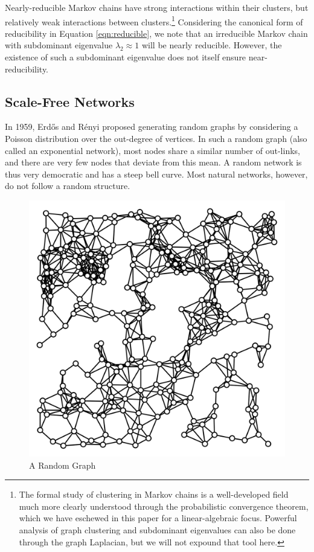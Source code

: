 \documentclass[12pt]{article}
\begin{document}
Nearly-reducible Markov chains have strong interactions within their clusters,
but relatively weak interactions between clusters.\footnote{The formal study of
  clustering in Markov chains is a well-developed field much more clearly
  understood through the probabilistic convergence theorem, which we have
  eschewed in this paper for a linear-algebraic focus. Powerful analysis of
  graph clustering and subdominant eigenvalues can also be done through the
  graph Laplacian, but we will not expound that tool here.} Considering the
canonical form of reducibility in Equation \eqref{eqn:reducible}, we note that
an irreducible Markov chain with subdominant eigenvalue $\lambda_2 \approx 1$
will be nearly reducible. However, the existence of such a subdominant
eigenvalue does not itself ensure near-reducibility.


\subsection{Scale-Free Networks}
In 1959, Erdős and Rényi proposed generating random graphs by considering a
Poisson distribution over the out-degree of vertices. In such a random graph
(also called an exponential network), most nodes share a similar number of
out-links, and there are very few nodes that deviate from this mean. A random
network is thus very democratic and has a steep bell curve. Most natural
networks, however, do not follow a random structure.
\begin{figure}
  \centering
  \includegraphics[scale=0.15]{random-graph}
  \caption{A Random Graph \cite{RandomGeometricGraph}}
  \label{fig:random}
\end{figure}
\end{document}
